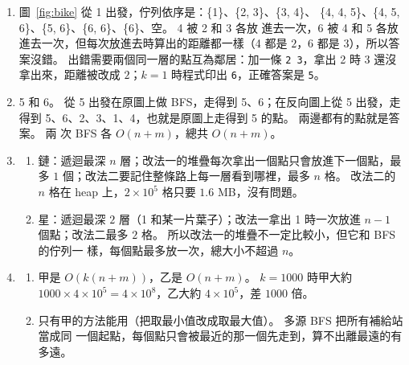 \begin{enumerate}
\item 圖~\ref{fig:bike} 從 1 出發，佇列依序是：\{1\}、\{2, 3\}、\{3, 4\}、
\{4, 4, 5\}、\{4, 5, 6\}、\{5, 6\}、\{6, 6\}、\{6\}、空。 4 被 2 和 3 各放
進去一次，6 被 4 和 5 各放進去一次，但每次放進去時算出的距離都一樣（4 都是
$2$，6 都是 $3$），所以答案沒錯。 出錯需要兩個同一層的點互為鄰居：加一條
\texttt{2 3}，拿出 2 時 3 還沒拿出來，距離被改成 $2$；$k = 1$ 時程式印出
\texttt{6}，正確答案是 \texttt{5}。

\item 5 和 6。 從 5 出發在原圖上做 BFS，走得到 5、6；在反向圖上從 5 出發，走
得到 5、6、2、3、1、4，也就是原圖上走得到 5 的點。 兩邊都有的點就是答案。 兩
次 BFS 各 $O(n + m)$，總共 $O(n + m)$。

\item
\begin{enumerate}
\item 鏈：遞迴最深 $n$ 層；改法一的堆疊每次拿出一個點只會放進下一個點，最多
$1$ 個；改法二要記住整條路上每一層看到哪裡，最多 $n$ 格。 改法二的 $n$ 格在
heap 上，$2 \times 10^5$ 格只要 $1.6$ MB，沒有問題。
\item 星：遞迴最深 $2$ 層（1 和某一片葉子）；改法一拿出 1 時一次放進 $n - 1$
個點；改法二最多 $2$ 格。 所以改法一的堆疊不一定比較小，但它和 BFS 的佇列一
樣，每個點最多放一次，總大小不超過 $n$。
\end{enumerate}

\item
\begin{enumerate}
\item 甲是 $O(k(n + m))$，乙是 $O(n + m)$。 $k = 1000$ 時甲大約
$1000 \times 4 \times 10^5 = 4 \times 10^8$，乙大約 $4 \times 10^5$，差
$1000$ 倍。
\item 只有甲的方法能用（把取最小值改成取最大值）。 多源 BFS 把所有補給站當成同
一個起點，每個點只會被最近的那一個先走到，算不出離最遠的有多遠。
\end{enumerate}
\end{enumerate}
